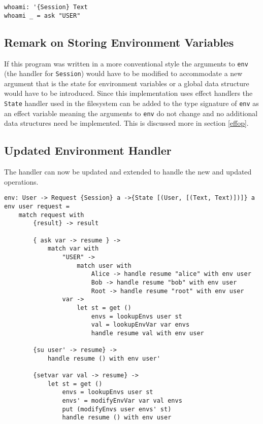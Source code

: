 \documentclass[logo,bsc,singlespacing,parskip]{infthesis}
\begin{document}
\begin{lstlisting}[language=unison]
whoami: '{Session} Text
whoami _ = ask "USER"
\end{lstlisting}

\subsection{Remark on Storing Environment Variables}

If this program was written in a more conventional style the arguments to
\texttt{env} (the handler for \texttt{Session}) would have to be modified to
accommodate a new argument that is the state for environment variables or a
global data structure would have to be introduced. Since this implementation
uses effect handlers the \texttt{State} handler used in the filesystem can be
added to the type signature of \texttt{env} as an effect variable meaning the
arguments to \texttt{env} do not change and no additional data structures need
be implemented. This is discussed more in section \ref{effop}.

\subsection{Updated Environment Handler}

The handler can now be updated and extended to handle the new and updated operations.

\begin{lstlisting}[language=unison]
env: User -> Request {Session} a ->{State [(User, [(Text, Text)])]} a
env user request = 
    match request with
        {result} -> result

        { ask var -> resume } -> 
            match var with 
                "USER" ->
                    match user with 
                        Alice -> handle resume "alice" with env user
                        Bob -> handle resume "bob" with env user
                        Root -> handle resume "root" with env user
                var -> 
                    let st = get ()
                        envs = lookupEnvs user st
                        val = lookupEnvVar var envs
                        handle resume val with env user

        {su user' -> resume} -> 
            handle resume () with env user'

        {setvar var val -> resume} -> 
            let st = get ()
                envs = lookupEnvs user st
                envs' = modifyEnvVar var val envs
                put (modifyEnvs user envs' st) 
                handle resume () with env user
\end{lstlisting}
\end{document}
